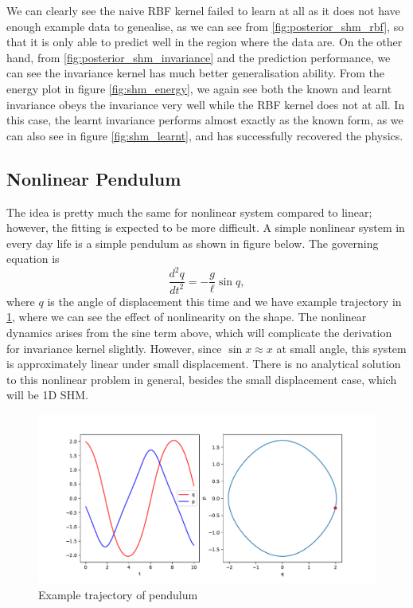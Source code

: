 \documentclass{statsmsc}
\begin{document}
We can clearly see the naive RBF kernel failed to learn at all as it does not have enough example data to genealise, as we can see from \ref{fig:posterior_shm_rbf}, so that it is only able to predict well in the region where the data are. 
On the other hand, from \ref{fig:posterior_shm_invariance} and the prediction performance, we can see the invariance kernel has much better generalisation ability.
From the energy plot in figure \ref{fig:shm_energy}, we again see both the known and learnt invariance obeys the invariance very well while the RBF kernel does not at all.
In this case, the learnt invariance performs almost exactly as the known form, as we can also see in figure \ref{fig:shm_learnt}, and has successfully recovered the physics. 


\subsection{Nonlinear Pendulum}
The idea is pretty much the same for nonlinear system compared to linear; however, the fitting is expected to be more difficult.
A simple nonlinear system in every day life is a simple pendulum as shown in figure below.
The governing equation is 
$$
\frac{d^2q}{dt^2}=-\frac{g}{\ell}\sin q, 
$$
where $q$ is the angle of displacement this time and we have example trajectory in \ref{fig:pendulum_trajectory}, where we can see the effect of nonlinearity on the shape. 
The nonlinear dynamics arises from the sine term above, which will complicate the derivation for invariance kernel slightly. 
However, since $\sin x \approx x$ at small angle, this system is approximately linear under small displacement. 
There is no analytical solution to this nonlinear problem in general, besides the small displacement case, which will be 1D SHM.

\begin{figure}[H] 
  \includegraphics[width=0.8\linewidth]{../codes/figures/pendulum_trajectory_1D.pdf}
  \centering
  \caption{Example trajectory of pendulum}
  \label{fig:pendulum_trajectory}
\end{figure}
\end{document}
